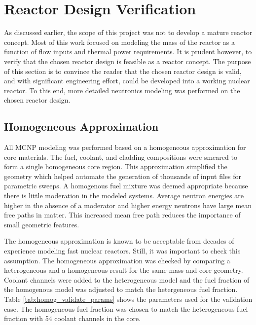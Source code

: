 \chapter{Reactor Design Verification}\label{ch:verification}
    As discussed earlier, the scope of this project was not to develop a mature
reactor concept. Most of this work focused on modeling the mass of the
reactor as a function of flow inputs and thermal power requirements. It is
prudent however, to verify that the chosen reactor design is feasible as a
reactor concept. The purpose of this section is to convince the reader that
the chosen reactor design is valid, and with significant engineering effort,
could be developed into a working nuclear reactor. To this end, more detailed
neutronics modeling was performed on the chosen reactor design.

\section{Homogeneous Approximation}
All MCNP modeling was performed based on a homogeneous approximation for core
materials. The fuel, coolant, and cladding compositions were smeared to form a
single homogeneous core region. This approximation simplified the geometry which
helped automate the generation of thousands of input files for parametric
sweeps. A homogenous fuel mixture was deemed appropriate because there is little
moderation in the modeled systems. Average neutron energies are higher in the
absence of a moderator and higher energy neutrons have large mean free paths in
matter. This increased mean free path reduces the importance of small geometric
features.

The homogeneous approximation is known to be acceptable from decades of
experience modeling fast nuclear reactors. Still, it was important to check
this assumption. The homogeneous approximation was checked by comparing a
heterogeneous and a homogeneous \keff result for the same \uran mass and core
geometry. Coolant channels were added to the heterogeneous model and the fuel
fraction of the homogenous model was adjusted to match the hetergeneous fuel
fraction. Table \ref{tab:homog_validate_params} shows the parameters used for
the validation case. The homogeneous fuel fraction was chosen to match the
heterogeneous fuel fraction with 54 coolant channels in the core.


